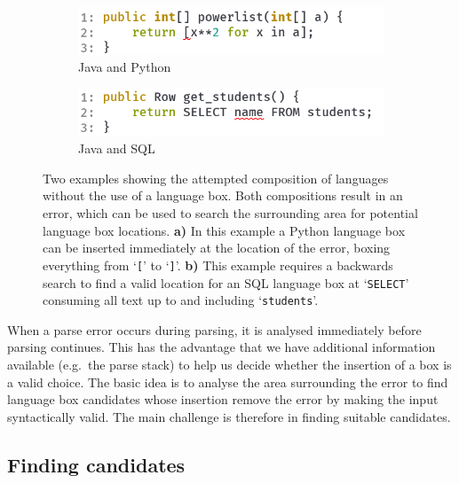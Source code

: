 \documentclass[sigplan,screen]{acmart}\settopmatter{printfolios=true,printccs=false,printacmref=false}
\newcommand{\qtt}[1]{`\texttt{#1}'\xspace}
\begin{document}
\begin{figure}
    \begin{subfigure}{0.4\textwidth}
    \includegraphics[width=1\textwidth]{images/composition_error2.png}
    \caption{Java and Python}
  \end{subfigure}
    \hspace{2em}
  \begin{subfigure}{0.4\textwidth}
    \includegraphics[width=1\textwidth]{images/composition_error1.png}
    \caption{Java and SQL}
  \end{subfigure}
\caption{Two examples showing the attempted composition of languages without the
use of a language box. Both compositions result in an error, which can be used
to search the surrounding area for potential language box locations.
\textbf{a)} In this example a Python language box can be inserted immediately
at the location of the error, boxing everything from \qtt{[} to \qtt{]}.
\textbf{b)} This example requires a backwards search to find a valid location
for an SQL language box at `\texttt{SELECT}' consuming all text up to and including
\qtt{students}.}
\label{fig_heuristic_example}
\end{figure}

When a parse error occurs during parsing, it is analysed immediately before
parsing continues. This has
the advantage that we have additional information available (e.g.~the parse
stack) to help us decide whether the insertion of a box is a valid choice.
The basic idea is to analyse the area surrounding the error to find language
box candidates whose insertion remove the error by making the input
syntactically valid. The main challenge is therefore in finding suitable
candidates.

\subsection{Finding candidates}
\end{document}
